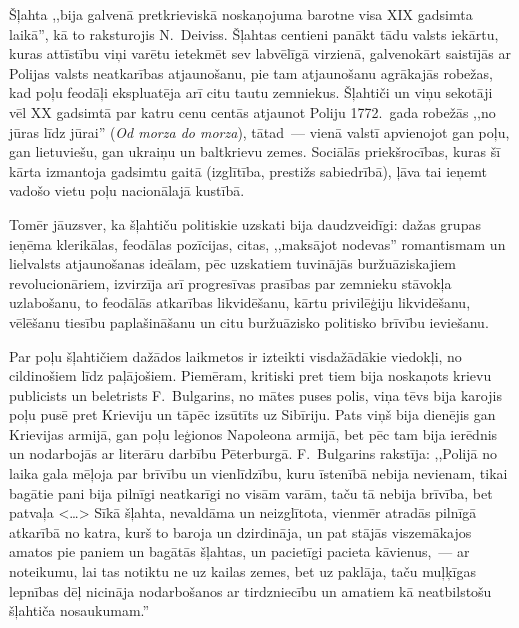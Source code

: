 \documentclass[twoside,a5paper,12pt,fleqn,openany]{extbook}
\newcommand{\pltxti}[1]{\textit{\textpolish{#1}}}
\newcommand{\citespace}{<\dots{}>}
\begin{document}
Šļahta ,,bija galvenā pretkrieviskā noskaņojuma barotne visa XIX gadsimta laikā'', kā to raksturojis N.~Deiviss. Šļahtas centieni panākt tādu valsts iekārtu, kuras attīstību viņi varētu ietekmēt sev labvēlīgā virzienā, galvenokārt saistījās ar Polijas valsts neatkarības atjaunošanu, pie tam atjaunošanu agrākajās robežas, kad poļu feodāļi ekspluatēja arī citu tautu zemniekus. Šļahtiči un viņu sekotāji vēl XX gadsimtā par katru cenu centās atjaunot Poliju 1772.~gada robežās ,,no jūras līdz jūrai'' (\pltxti{Od morza do morza}), tātad~--- vienā valstī apvienojot gan poļu, gan lietuviešu, gan ukraiņu un baltkrievu zemes. Sociālās priekšrocības, kuras šī kārta izmantoja gadsimtu gaitā (izglītība, prestižs sabiedrībā), ļāva tai ieņemt vadošo vietu poļu nacionālajā kustībā.

Tomēr jāuzsver, ka šļahtiču politiskie uzskati bija daudzveidīgi: dažas grupas ieņēma klerikālas, feodālas pozīcijas, citas, ,,maksājot nodevas'' romantismam un lielvalsts atjaunošanas ideālam, pēc uzskatiem tuvinājās buržuāziskajiem revolucionāriem, izvirzīja arī progresīvas prasības par zemnieku stāvokļa uzlabošanu, to feodālās atkarības likvidēšanu, kārtu privilēģiju likvidēšanu, vēlēšanu tiesību paplašināšanu un citu buržuāzisko politisko brīvību ieviešanu.

Par poļu šļahtičiem dažādos laikmetos ir izteikti visdažādākie viedokļi, no cildinošiem līdz paļājošiem. Piemēram, kritiski pret tiem bija noskaņots krievu publicists un beletrists F.~Bulgarins, no mātes puses polis, viņa tēvs bija karojis poļu pusē pret Krieviju un tāpēc izsūtīts uz Sibīriju. Pats viņš bija dienējis gan Krievijas armijā, gan poļu leģionos Napoleona armijā, bet pēc tam bija ierēdnis un nodarbojās ar literāru darbību Pēterburgā. F.~Bulgarins rakstīja: ,,Polijā no laika gala mēļoja par brīvību un vienlīdzību, kuru īstenībā nebija nevienam, tikai bagātie pani bija pilnīgi neatkarīgi no visām varām, taču tā nebija brīvība, bet patvaļa \citespace{} Sīkā šļahta, nevaldāma un neizglītota, vienmēr atradās pilnīgā atkarībā no katra, kurš to baroja un dzirdināja, un pat stājās viszemākajos amatos pie paniem un bagātās šļahtas, un pacietīgi pacieta kāvienus,~--- ar noteikumu, lai tas notiktu ne uz kailas zemes, bet uz paklāja, taču muļķīgas lepnības dēļ nicināja nodarbošanos ar tirdzniecību un amatiem kā neatbilstošu šļahtiča nosaukumam.''
\end{document}
